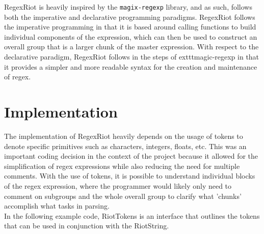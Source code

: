 \documentclass[conference]{IEEEtran}
\begin{document}
RegexRiot is heavily inspired by the \texttt{magix-regexp} library, and as such,
follows both the imperative and declarative programming paradigms.
RegexRiot follows the imperative programming in that it is based around calling functions
to build individual components of the expression, which can then be used to construct an overall group that is a larger chunk of the master expression. With respect to the declarative paradigm, RegexRiot follows in the steps of 	exttt{magic-regexp} in that it provides a simpler and more readable syntax for the creation and maintenance of regex.

\section{Implementation}
The implementation of RegexRiot heavily depends on the usage of tokens to denote specific
primitives such as characters, integers, floats, etc. This was an important coding decision
in the context of the project because it allowed for the simplification of regex expressions
while also reducing the need for multiple comments. With the use of tokens, it is possible to
understand individual blocks of the regex expression, where the programmer would likely only
need to comment on subgroups and the whole overall group to clarify what 'chunks' accomplish
what tasks in parsing.
\\
In the following example code, RiotTokens is an interface that outlines the tokens that can
be used in conjunction with the RiotString.
\end{document}
